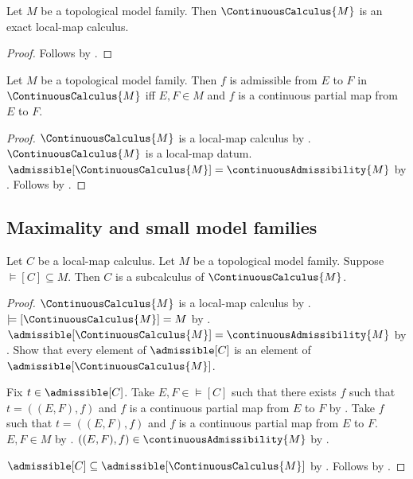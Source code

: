 \begin{theorem}\label{continuous_calculus_is_exact}
    Let $M$ be a topological model family.
    Then $\ContinuousCalculus{M}$ is an exact local-map calculus.
\end{theorem}
\begin{proof}
    Follows by .
\end{proof}

\begin{theorem}\label{continuous_calculus_admissible_iff}
    Let $M$ be a topological model family.
    Then $f$ is admissible from $E$ to $F$ in $\ContinuousCalculus{M}$ iff
        $E,F\in M$ and $f$ is a continuous partial map from $E$ to $F$.
\end{theorem}
\begin{proof}
    $\ContinuousCalculus{M}$ is a local-map calculus by .
    $\ContinuousCalculus{M}$ is a local-map datum.
    $\admissible[\ContinuousCalculus{M}]=\continuousAdmissibility{M}$ by
        .
    Follows by .
\end{proof}

\subsection{Maximality and small model families}

\begin{theorem}\label{continuous_calculus_maximal}
    Let $C$ be a local-map calculus.
    Let $M$ be a topological model family.
    Suppose $\models[C]\subseteq M$.
    Then $C$ is a subcalculus of $\ContinuousCalculus{M}$.
\end{theorem}
\begin{proof}
    $\ContinuousCalculus{M}$ is a local-map calculus by .
    $\models[\ContinuousCalculus{M}]=M$ by .
    $\admissible[\ContinuousCalculus{M}]=\continuousAdmissibility{M}$ by
        .
    Show that every element of $\admissible[C]$ is an element of
        $\admissible[\ContinuousCalculus{M}]$.
    \begin{subproof}
        Fix $t\in\admissible[C]$.
        Take $E,F\in\models[C]$ such that there exists $f$ such that
            $t=((E,F),f)$ and $f$ is a continuous partial map from $E$ to $F$
            by .
        Take $f$ such that $t=((E,F),f)$ and
            $f$ is a continuous partial map from $E$ to $F$.
        $E,F\in M$ by .
        $((E,F),f)\in\continuousAdmissibility{M}$ by
            .
    \end{subproof}
    $\admissible[C]\subseteq\admissible[\ContinuousCalculus{M}]$ by
        .
    Follows by .
\end{proof}

